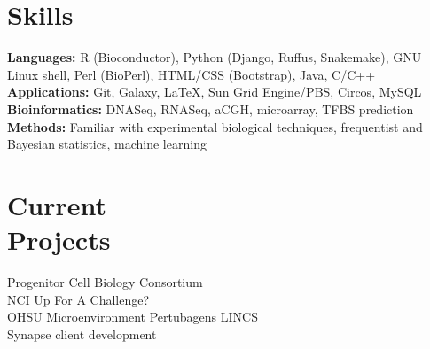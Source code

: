 \documentclass[margin,line]{res}
\begin{document}
\begin{resume}
\section{\sc Skills} 
\textbf{Languages:} R (Bioconductor), Python (Django, Ruffus, Snakemake), GNU Linux shell, Perl (BioPerl), HTML/CSS (Bootstrap), Java, C/C++\\
\textbf{Applications:} Git, Galaxy, \LaTeX, Sun Grid Engine/PBS, Circos, MySQL\\
\textbf{Bioinformatics:} DNASeq, RNASeq, aCGH, microarray, TFBS prediction\\
\textbf{Methods:} Familiar with experimental biological techniques, frequentist and Bayesian statistics, machine learning

\section{\sc Current\\Projects}
\begin{itemize}
\itemsep -2pt %
Progenitor Cell Biology Consortium \\
NCI Up For A Challenge? \\
OHSU Microenvironment Pertubagens LINCS \\
Synapse client development \\
\end{itemize}



\end{resume}
\end{document}
